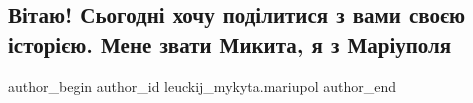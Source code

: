  
 
 
 
 

\subsection{Вітаю! Сьогодні хочу поділитися з вами своєю історією. Мене звати Микита, я з Маріуполя}
\label{sec:22_06_2022.fb.leuckij_mykyta.mariupol.1.istoria}

\ifcmt
 author_begin
   author_id leuckij_mykyta.mariupol
 author_end
\fi

